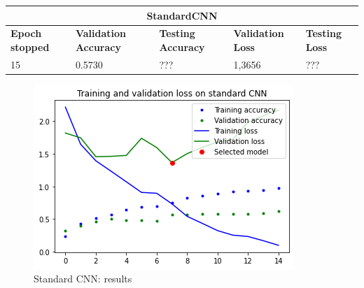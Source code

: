 \medskip

\begin{tabular}{ |p{2cm}|p{2cm}|p{2cm}|p{2cm}|p{2cm}|  }
\hline
\multicolumn{5}{|c|}{StandardCNN} \\
\hline
\textbf{Epoch stopped} & \textbf{Validation Accuracy} & \textbf{Testing Accuracy} & \textbf{Validation Loss} & \textbf{Testing Loss} \\
\hline
15 & 0.5730 & ??? & 1,3656 & ???\\
\hline
\end{tabular}

\medskip

\begin{figure}[H]
	\centering
	\includegraphics[height=0.45\textwidth]{img/scratch/standardCNN_results.png}
	\caption{Standard CNN: results}
	\label{fig:standardCNN_acc}
\end{figure}